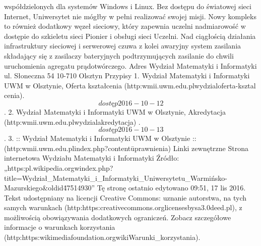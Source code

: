 \documentclass[a4paper,12pt]{article}
\begin{document}
współdzielonych dla systemów Windows i Linux.
Bez dostępu do światowej sieci Internet, Uniwersytet nie mógłby w pełni realizować swojej misji. Nowy
kompleks to również dodatkowy węzeł sieciowy, który zapewnia uczelni nadmiarowość w dostępie do
szkieletu sieci Pionier i obsługi sieci Uczelni. Nad ciągłością działania infrastruktury sieciowej i serwerowej
czuwa z kolei awaryjny system zasilania składający się z zasilaczy bateryjnych podtrzymujących zasilanie do
chwili uruchomienia agregatu prądotwórczego.
Adres
Wydział Matematyki i Informatyki
ul. Słoneczna 54
10-710 Olsztyn
Przypisy
1. Wydział Matematyki i Informatyki UWM w Olsztynie, Oferta kształcenia (http:\/\/wmii.uwm.edu.pl\/wydzial\/oferta-ksztal
cenia). \[dostęp 2016-10-12\].
2. Wydział Matematyki i Informatyki UWM w Olsztynie, Akredytacja (http:\/\/wmii.uwm.edu.pl\/wydzial\/akredytacja) .
\[dostęp 2016-10-13\].
3. :: Wydział Matematyki i Informatyki UWM w Olsztynie :: (http:\/\/wmii.uwm.edu.pl\/index.php?content\=uprawnienia)
Linki zewnętrzne
Strona internetowa Wydziału Matematyki i Informatyki
Źródło: „https:\/\/pl.wikipedia.org\/w\/index.php?
title=Wydział\_Matematyki\_i\_Informatyki\_Uniwersytetu\_Warmińsko-Mazurskiego\&oldid\=47514930”
Tę stronę ostatnio edytowano 09:51, 17 lis 2016. Tekst udostępniany na licencji Creative Commons:
uznanie autorstwa, na tych samych warunkach (http:https:\/\/creativecommons.org\/licenses\/bysa\/3.0\/deed.pl),
z możliwością obowiązywania dodatkowych ograniczeń. Zobacz szczegółowe
informacje o warunkach korzystania (http:https:\/\/wikimediafoundation.org\/wiki\/Warunki\_korzystania).
\end{document}
